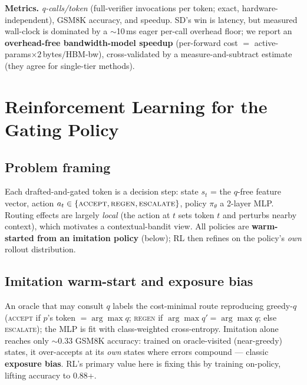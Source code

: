 \documentclass[11pt]{article}
\begin{document}
\textbf{Metrics.} \emph{q-calls/token} (full-verifier invocations per token; exact, hardware-independent),
GSM8K accuracy, and speedup. SD's win is latency, but measured wall-clock is dominated by a
$\sim$10\,ms eager per-call overhead floor; we report an \textbf{overhead-free bandwidth-model
speedup} (per-forward cost $=$ active-params$\times2$\,bytes$/$HBM-bw), cross-validated by a
measure-and-subtract estimate (they agree for single-tier methods).

\section{Reinforcement Learning for the Gating Policy}

\subsection{Problem framing}
Each drafted-and-gated token is a decision step: state $s_t$ = the $q$-free feature vector,
action $a_t\in\{\textsc{accept},\textsc{regen},\textsc{escalate}\}$, policy $\pi_\theta$ a 2-layer MLP.
Routing effects are largely \emph{local} (the action at $t$ sets token $t$ and perturbs nearby
context), which motivates a contextual-bandit view. All policies are \textbf{warm-started from an
imitation policy} (below); RL then refines on the policy's \emph{own} rollout distribution.

\subsection{Imitation warm-start and exposure bias}
An oracle that may consult $q$ labels the cost-minimal route reproducing greedy-$q$
(\textsc{accept} if $p$'s token $=\arg\max q$; \textsc{regen} if $\arg\max q'=\arg\max q$;
else \textsc{escalate}); the MLP is fit with class-weighted cross-entropy. Imitation alone
reaches only $\sim$0.33 GSM8K accuracy: trained on oracle-visited (near-greedy) states, it
over-accepts at its \emph{own} states where errors compound --- classic \textbf{exposure bias}.
RL's primary value here is fixing this by training on-policy, lifting accuracy to $0.88$+.
\end{document}
